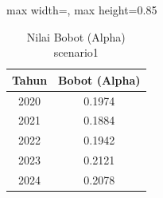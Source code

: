 \begin{table}[H]
\centering
\caption{Nilai Bobot (Alpha) scenario1} \makeatletter{}\makeatother
\begin{adjustbox}{max width=\textwidth, max height=0.85\textheight}
\begin{tabular}{|c|c|}
\hline
\textbf{Tahun} & \textbf{Bobot (Alpha)} \\
\hline
2020 & 0.1974 \\
2021 & 0.1884 \\
2022 & 0.1942 \\
2023 & 0.2121 \\
2024 & 0.2078 \\
\hline
\end{tabular}
\end{adjustbox}
\end{table}